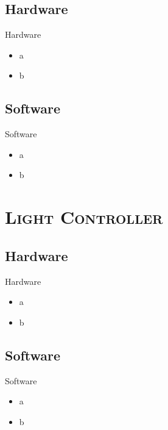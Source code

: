 	\subsection{Hardware}
	\begin{frame}{Hardware}
		\begin{itemize}
			\item a
			\item b
		\end{itemize}
		
	\end{frame}
	
	\subsection{Software}
	\begin{frame}{Software}
		\begin{itemize}
			\item a
			\item b
		\end{itemize}
		
	\end{frame}
	
	\section{\scshape Light Controller}
	\subsection{Hardware}
	\begin{frame}{Hardware}
		\begin{itemize}
			\item a
			\item b
		\end{itemize}
		
	\end{frame}

	\subsection{Software}
	\begin{frame}{Software}
		\begin{itemize}
			\item a
			\item b
		\end{itemize}
		
	\end{frame}
	
